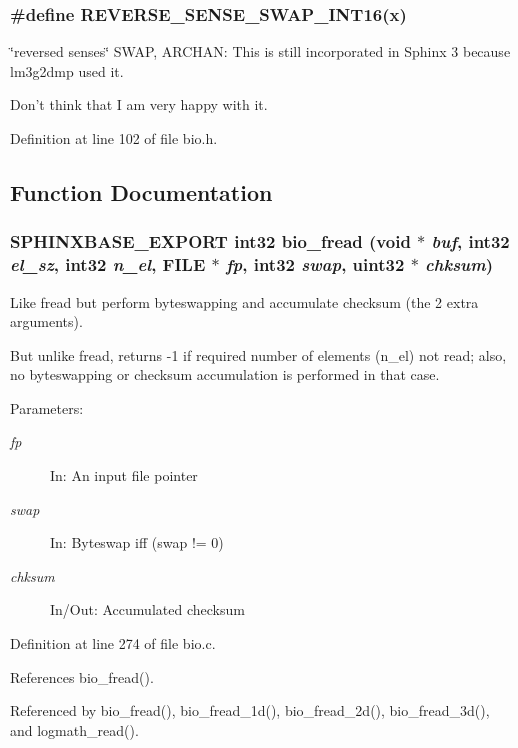 \subsubsection[{REVERSE\_\-SENSE\_\-SWAP\_\-INT16}]{\setlength{\rightskip}{0pt plus 5cm}\#define REVERSE\_\-SENSE\_\-SWAP\_\-INT16(x)}\label{bio_8h_bf9af8ac9d8a67710371365812869c92}


\char`\"{}reversed senses\char`\"{} SWAP, ARCHAN: This is still incorporated in Sphinx 3 because lm3g2dmp used it. 

Don't think that I am very happy with it. 

Definition at line 102 of file bio.h.

\subsection{Function Documentation}
\subsubsection[{bio\_\-fread}]{\setlength{\rightskip}{0pt plus 5cm}SPHINXBASE\_\-EXPORT int32 bio\_\-fread (void $\ast$ {\em buf}, \/  int32 {\em el\_\-sz}, \/  int32 {\em n\_\-el}, \/  FILE $\ast$ {\em fp}, \/  int32 {\em swap}, \/  uint32 $\ast$ {\em chksum})}\label{bio_8h_7068bb61e421bc46a6989cef3b37c833}


Like fread but perform byteswapping and accumulate checksum (the 2 extra arguments). 

But unlike fread, returns -1 if required number of elements (n\_\-el) not read; also, no byteswapping or checksum accumulation is performed in that case. \begin{Desc}
\item[Parameters: ]\par
\begin{description}
\item[{\em 
fp}]In: An input file pointer \item[{\em 
swap}]In: Byteswap iff (swap != 0) \item[{\em 
chksum}]In/Out: Accumulated checksum \end{description}
\end{Desc}


Definition at line 274 of file bio.c.

References bio\_\-fread().

Referenced by bio\_\-fread(), bio\_\-fread\_\-1d(), bio\_\-fread\_\-2d(), bio\_\-fread\_\-3d(), and logmath\_\-read().
